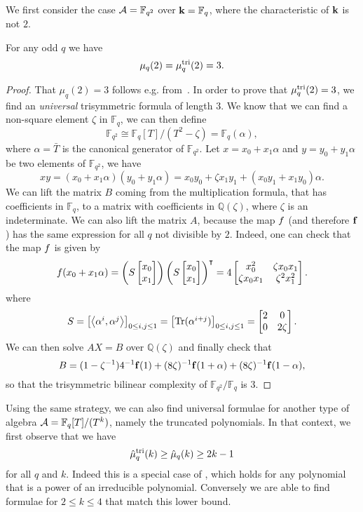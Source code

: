 \documentclass[11pt]{article}
\begin{document}
We first consider the case $\mathcal{A}=\mathbb{F}_{q^2}$ over $\mathbf{k}=\mathbb{F}_q$, where
the characteristic of $\mathbf{k}$ is not $2$.
\begin{prop}
For any odd $q$ we have
\[
  \mu_q(2) = \mu^{\textrm{tri}}_q(2) = 3.
\]
\end{prop}
\begin{proof}
That $\mu_q(2)=3$ follows e.g. from~\cite[Thm. 2.2]{BCPRRR19}. In order to prove that
$\mu^{\textrm{tri}}_q(2) = 3$, we find an \emph{universal} trisymmetric formula of length
$3$. We know that we can find a non-square element $\zeta$ in $\mathbb{F}_q$, we
can then define
\[
  \mathbb{F}_{q^2}\cong\mathbb{F}_q[T]/(T^2-\zeta)=\mathbb{F}_{q}(\alpha),
\]
where $\alpha=\bar T$ is the canonical generator of $\mathbb{F}_{q^2}$. Let $x =
x_0 + x_1\alpha$ and $y = y_0 + y_1\alpha$ be two elements of
$\mathbb{F}_{q^2}$, we have
\[
  xy = (x_0+x_1\alpha)(y_0+y_1\alpha)=x_0y_0+\zeta x_1y_1
  +(x_0y_1+x_1y_0)\alpha.
\]
We can lift the matrix $B$ coming from
the multiplication formula, that has coefficients in $\mathbb{F}_{q}$, to a
matrix with coefficients in $\mathbb{Q}(\zeta)$, where $\zeta$ is an
indeterminate. We can also lift the matrix $A$, because the map
$f$ (and therefore $\mathbf{f}$) has the same expression for all $q$ not divisible by
$2$.
Indeed, one can check that the map $f$ is given by
\[
  f(x_0+x_1\alpha)=
  \left(S 
  \begin{bmatrix}
    x_0 \\
    x_1
  \end{bmatrix}\right)
  \left(S 
  \begin{bmatrix}
    x_0 \\
    x_1
  \end{bmatrix}\right)^\intercal
  =
  4\begin{bmatrix}
   x_0^2 & \zeta x_0x_1 \\
   \zeta x_0 x_1 & \zeta^2 x_1^2
  \end{bmatrix}.
\]
where
\[
  S =
  \begin{bmatrix}
    \left\langle\alpha^i,\alpha^j\right\rangle
  \end{bmatrix}_{0\leq i, j\leq 1}
  =
  \begin{bmatrix}
    \operatorname{Tr}(\alpha^{i+j})
  \end{bmatrix}_{0\leq i, j\leq 1}
  =
  \begin{bmatrix}
   2 & 0 \\
   0 & 2\zeta
  \end{bmatrix}.
\]
We can then solve $AX=B$ over
$\mathbb{Q}(\zeta)$ and finally check that
\[
  B = (1-\zeta^{-1})4^{-1}\mathbf{f}(1) +
  (8\zeta)^{-1}\mathbf{f}(1+\alpha)+(8\zeta)^{-1}\mathbf{f}(1-\alpha),
\]
so that the trisymmetric bilinear complexity of
$\mathbb{F}_{q^2}/\mathbb{F}_{q}$ is $3$.
\end{proof}
Using the same strategy, we can also
find universal formulae for another type of algebra
$\mathcal{A} = \mathbb{F}_{q}[T]/(T^k)$, namely the truncated polynomials.
In that context, we first observe that we have
\[ \hat\mu^{\textrm{tri}}_q(k)\geq\hat\mu_q(k)\geq2k-1 \]
for all $q$ and $k$.
Indeed this is a special case of \cite[Thm.~4]{Winograd77},
which holds for any polynomial that is a power of an irreducible polynomial.
Conversely we
are able to find formulae for $2\leq k \leq 4$ that match this lower bound.
\end{document}
